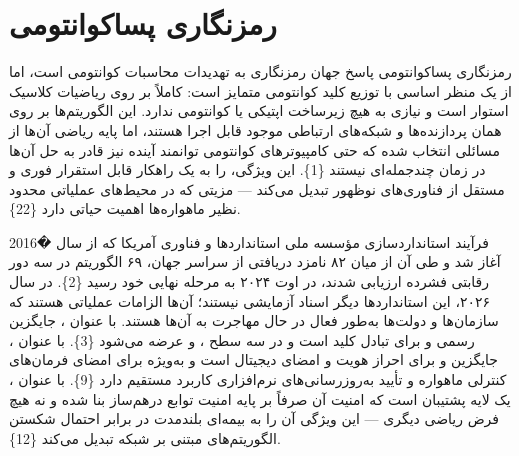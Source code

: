 \documentclass[a4paper,14pt]{extreport}
\begin{document}
\section{رمزنگاری پساکوانتومی}

رمزنگاری پساکوانتومی  پاسخ جهان رمزنگاری به تهدیدات محاسبات کوانتومی است، اما از یک منظر اساسی با توزیع کلید کوانتومی متمایز است:  کاملاً بر روی ریاضیات کلاسیک استوار است و نیازی به هیچ زیرساخت اپتیکی یا کوانتومی ندارد. این الگوریتم‌ها بر روی همان پردازنده‌ها و شبکه‌های ارتباطی موجود قابل اجرا هستند، اما پایه ریاضی آن‌ها از مسائلی انتخاب شده که حتی کامپیوترهای کوانتومی توانمند آینده نیز قادر به حل آن‌ها در زمان چندجمله‌ای نیستند \{1\}. این ویژگی،  را به یک راهکار قابل استقرار فوری و مستقل از فناوری‌های نوظهور تبدیل می‌کند — مزیتی که در محیط‌های عملیاتی محدود نظیر ماهواره‌ها اهمیت حیاتی دارد \{22\}.

فرآیند استانداردسازی مؤسسه ملی استانداردها و فناوری آمریکا  که از سال �2016 آغاز شد و طی آن از میان ۸۲ نامزد دریافتی از سراسر جهان، ۶۹ الگوریتم در سه دور رقابتی فشرده ارزیابی شدند، در اوت ۲۰۲۴ به مرحله نهایی خود رسید \{2\}. در سال ۲۰۲۶، این استانداردها دیگر اسناد آزمایشی نیستند؛ آن‌ها الزامات عملیاتی هستند که سازمان‌ها و دولت‌ها به‌طور فعال در حال مهاجرت به آن‌ها هستند. \textbf{} با عنوان ، جایگزین رسمی  و  برای تبادل کلید است و در سه سطح ،  و  عرضه می‌شود \{3\}. \textbf{} با عنوان ، جایگزین  و  برای احراز هویت و امضای دیجیتال است و به‌ویژه برای امضای فرمان‌های کنترلی ماهواره و تأیید به‌روزرسانی‌های نرم‌افزاری کاربرد مستقیم دارد \{9\}. \textbf{} با عنوان ، یک لایه پشتیبان است که امنیت آن صرفاً بر پایه امنیت توابع درهم‌ساز  بنا شده و نه هیچ فرض ریاضی دیگری — این ویژگی آن را به بیمه‌ای بلندمدت در برابر احتمال شکستن الگوریتم‌های مبتنی بر شبکه تبدیل می‌کند \{12\}.
\end{document}
